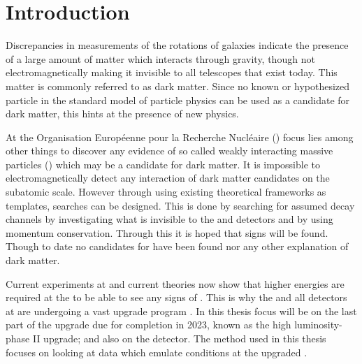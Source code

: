 \chapter{Introduction}\label{cha:intro}
Discrepancies in measurements of the rotations of galaxies indicate the presence of a large amount of matter which interacts through gravity, though not electromagnetically making it invisible to all telescopes that exist today. This matter is commonly referred to as dark matter. Since no known or hypothesized particle in the standard model of particle physics can be used as a candidate for dark matter, this hints at the presence of new physics. 

At the Organisation Européenne pour la Recherche Nucléaire (\abbrCERN) focus lies among other things to discover any evidence of so called weakly interacting massive particles (\abbrWIMPS) which may be a candidate for dark matter. It is impossible to electromagnetically detect any interaction of dark matter candidates on the subatomic scale. However through using existing theoretical frameworks as templates, searches can be designed. This is done by searching for assumed decay channels by investigating what is invisible to the \abbrATLAS and \abbrCMS detectors and by using momentum conservation. Through this it is hoped that signs will be found. Though to date no candidates for \abbrWIMPS have been found nor any other explanation of dark matter. 

Current experiments at \abbrCERN and current theories now show that higher energies are required at the \abbrLHC to be able to see any signs of \abbrWIMPS . This is why the \abbrLHC and all detectors at \abbrCERN are undergoing a vast upgrade program \citep{ATLAS:LOI2}.
In this thesis focus will be on the last part of the upgrade due for completion in 2023, known as the high luminosity-\abbrLHC phase II upgrade; and also on the \abbrATLAS detector. The method used in this thesis focuses on looking at data which emulate conditions at the upgraded \abbrLHC .

\newpage
